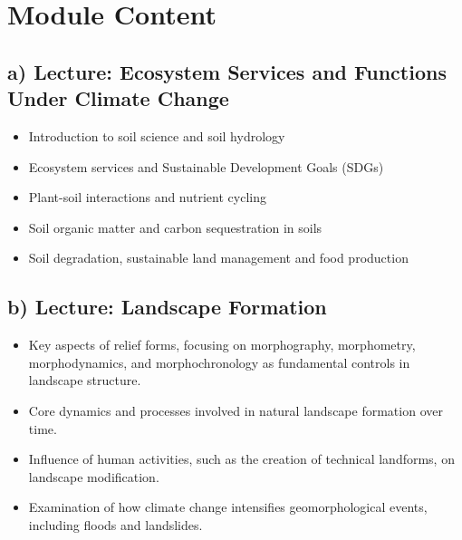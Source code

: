 \documentclass[
  letterpaper,
  10pt,
  openany]{book}
\providecommand{\tightlist}{%
  \setlength{\itemsep}{0pt}\setlength{\parskip}{0pt}}\usepackage{longtable,booktabs,array}
\begin{document}
\section*{Module Content}\label{module-content-3}


\subsection*{a) Lecture: Ecosystem Services and Functions Under Climate
Change}\label{a-lecture-ecosystem-services-and-functions-under-climate-change-2}

\begin{itemize}
\tightlist
\item
  Introduction to soil science and soil hydrology
\item
  Ecosystem services and Sustainable Development Goals (SDGs)
\item
  Plant-soil interactions and nutrient cycling
\item
  Soil organic matter and carbon sequestration in soils
\item
  Soil degradation, sustainable land management and food production
\end{itemize}

\subsection*{b) Lecture: Landscape
Formation}\label{b-lecture-landscape-formation-2}

\begin{itemize}
\tightlist
\item
  Key aspects of relief forms, focusing on morphography, morphometry,
  morphodynamics, and morphochronology as fundamental controls in
  landscape structure.
\item
  Core dynamics and processes involved in natural landscape formation
  over time.
\item
  Influence of human activities, such as the creation of technical
  landforms, on landscape modification.
\item
  Examination of how climate change intensifies geomorphological events,
  including floods and landslides.
\end{itemize}
\end{document}
